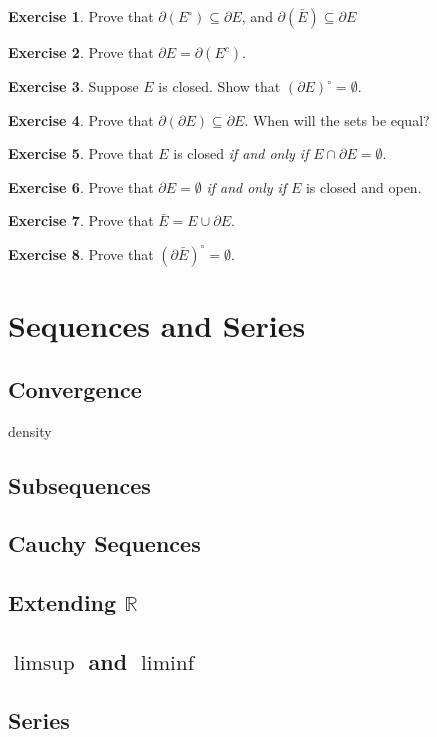 \documentclass{article}
\newcommand{\R}{\mathbb{R}}
\theoremstyle{definition}
\newtheorem{ex}{Exercise}[section]
\begin{document}
\begin{ex}
	Prove that $ \partial(E^\circ)\subseteq \partial E  $, and $ \partial(\bar{E})\subseteq \partial E  $
\end{ex}
\begin{ex}
	Prove that $ \partial E=\partial (E^c)  $.
\end{ex}
\begin{ex}
	Suppose $ E $ is closed. Show that $ (\partial E)^\circ=\emptyset $. 
\end{ex}
\begin{ex}
	Prove that $ \partial (\partial E)\subseteq \partial E $. When will the sets be equal? 
\end{ex}
\begin{ex}
	Prove that $ E $ is closed \textit{if and only if} $ E\cap \partial E=\emptyset $.
\end{ex}
\begin{ex}
	Prove that $ \partial E=\emptyset$ \textit{if and only if} $ E $ is closed and open.  
\end{ex}
\begin{ex}
	Prove that $ \bar{E}=E\cup\partial E $.
\end{ex}
\begin{ex}
	Prove that $ (\partial \bar{E})^\circ=\emptyset $. 
\end{ex}
\section{Sequences and Series}
\subsection{Convergence}
density
\subsection{Subsequences}
\subsection{Cauchy Sequences}
\subsection{Extending $ \R $}
\subsection{$ \limsup $ and $ \liminf $}
\subsection{Series}
\end{document}
